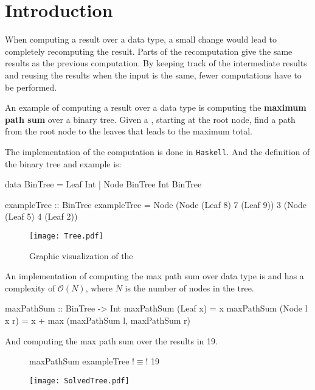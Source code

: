 \newpage
\section{Introduction}
When computing a result over a data type, a small change would lead to completely recomputing the result. Parts of the recomputation give the same results as the previous computation. By keeping track of the intermediate results and reusing the results when the input is the same, fewer computations have to be performed. 

An example of computing a result over a data type is computing the \textbf{maximum path sum} over a binary tree. Given a , starting at the root node, find a path from the root node to the leaves that leads to the maximum total.

The implementation of the computation is done in \texttt{Haskell}. And the definition of the binary tree and example is:
\begin{haskell}
data BinTree = Leaf Int
             | Node BinTree Int BinTree 
\end{haskell}

\begin{haskell}
exampleTree :: BinTree    
exampleTree = Node (Node (Leaf 8) 7 (Leaf 9)) 3 (Node (Leaf 5) 4 (Leaf 2))
\end{haskell}

\begin{figure}[H]
    \centering
    \texttt{[image: Tree.pdf]}
    \caption{Graphic visualization of the }
\end{figure}

An implementation of computing the max path sum over data type  is and has a complexity of $\mathcal{O}(N)$, where $N$ is the number of nodes in the tree.
\begin{haskell}
maxPathSum :: BinTree -> Int
maxPathSum (Leaf x)     = x
maxPathSum (Node l x r) = x + max (maxPathSum l, maxPathSum r)
\end{haskell}

\newpage
And computing the max path sum over the  results in 19.

\begin{figure}[H]
\begin{minipage}[c]{0.35\textwidth}
\begin{haskell}
maxPathSum exampleTree !$\equiv$! 19
\end{haskell}
\end{minipage}
\hspace{0.1\textwidth}
\begin{minipage}[c]{0.55\textwidth}
\texttt{[image: SolvedTree.pdf]}
\end{minipage}
\end{figure}

